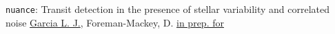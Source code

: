 
{\texttt{nuance}: Transit detection in the presence of stellar variability and correlated noise}
{\underline{Garcia L. J.}, Foreman-Mackey, D.}
{\href{https://github.com/lgrcia/paper-nuance/blob/main/latex/ms.pdf}{in prep. for \aap}}